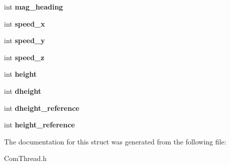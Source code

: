 \begin{DoxyCompactItemize}
\item 
\hypertarget{struct_i_m_u___c_a_l_c_d_a_t_a_ab8f527ccac6ec4616770379d997b075e}{int {\bfseries mag\-\_\-heading}}\label{struct_i_m_u___c_a_l_c_d_a_t_a_ab8f527ccac6ec4616770379d997b075e}

\item 
\hypertarget{struct_i_m_u___c_a_l_c_d_a_t_a_a8b5443860eed2a480a7e2b20675e0c18}{int {\bfseries speed\-\_\-x}}\label{struct_i_m_u___c_a_l_c_d_a_t_a_a8b5443860eed2a480a7e2b20675e0c18}

\item 
\hypertarget{struct_i_m_u___c_a_l_c_d_a_t_a_ac4dac3d6c5e14478523b7ac8a37ff5bd}{int {\bfseries speed\-\_\-y}}\label{struct_i_m_u___c_a_l_c_d_a_t_a_ac4dac3d6c5e14478523b7ac8a37ff5bd}

\item 
\hypertarget{struct_i_m_u___c_a_l_c_d_a_t_a_a6ce41a9a3713c022e37985cffef3ce3c}{int {\bfseries speed\-\_\-z}}\label{struct_i_m_u___c_a_l_c_d_a_t_a_a6ce41a9a3713c022e37985cffef3ce3c}

\item 
\hypertarget{struct_i_m_u___c_a_l_c_d_a_t_a_a9c0c414080458a1ce5fedf551eb3eda1}{int {\bfseries height}}\label{struct_i_m_u___c_a_l_c_d_a_t_a_a9c0c414080458a1ce5fedf551eb3eda1}

\item 
\hypertarget{struct_i_m_u___c_a_l_c_d_a_t_a_a9135b6900424074979ba389577eac8ed}{int {\bfseries dheight}}\label{struct_i_m_u___c_a_l_c_d_a_t_a_a9135b6900424074979ba389577eac8ed}

\item 
\hypertarget{struct_i_m_u___c_a_l_c_d_a_t_a_ad9299592afbaf73d0854e3f55984a0e5}{int {\bfseries dheight\-\_\-reference}}\label{struct_i_m_u___c_a_l_c_d_a_t_a_ad9299592afbaf73d0854e3f55984a0e5}

\item 
\hypertarget{struct_i_m_u___c_a_l_c_d_a_t_a_a0a2f6f13a5b73643a35bfe58da6b29f5}{int {\bfseries height\-\_\-reference}}\label{struct_i_m_u___c_a_l_c_d_a_t_a_a0a2f6f13a5b73643a35bfe58da6b29f5}

\end{DoxyCompactItemize}


The documentation for this struct was generated from the following file\-:\begin{DoxyCompactItemize}
\item 
Com\-Thread.\-h\end{DoxyCompactItemize}
